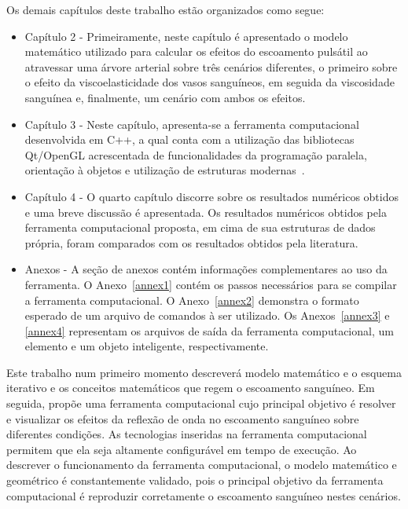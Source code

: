 Os demais capítulos deste trabalho estão organizados como segue:
\begin{itemize}
	\item Capítulo 2 -
	Primeiramente, neste capítulo é apresentado o modelo matemático utilizado para calcular os efeitos do escoamento pulsátil ao atravessar uma árvore arterial sobre três cenários diferentes, o primeiro sobre o efeito da viscoelasticidade dos vasos sanguíneos, em seguida da viscosidade sanguínea e, finalmente, um cenário com ambos os efeitos.
	
	\item Capítulo 3 -
	Neste capítulo, apresenta-se a ferramenta computacional desenvolvida em C++, a qual conta com a utilização das bibliotecas Qt/OpenGL acrescentada de funcionalidades da programação paralela, orientação à objetos e utilização de estruturas modernas~\cite{factorypattern}.
	
	\item Capítulo 4 -
	O quarto capítulo discorre sobre os resultados numéricos obtidos e uma breve discussão é apresentada. Os resultados numéricos obtidos pela ferramenta computacional proposta, em cima de sua estruturas de dados própria, foram comparados com os resultados obtidos pela literatura.
	
	\item Anexos -
	A seção de anexos contém informações complementares ao uso da ferramenta. O Anexo~\ref{annex1} contém os passos necessários para se compilar a ferramenta computacional. O Anexo~\ref{annex2} demonstra o formato esperado de um arquivo de comandos à ser utilizado. Os Anexos~\ref{annex3} e \ref{annex4} representam os arquivos de saída da ferramenta computacional, um elemento e um objeto inteligente, respectivamente.
\end{itemize}

Este trabalho num primeiro momento descreverá modelo matemático e o esquema iterativo e os conceitos matemáticos que regem o escoamento sanguíneo. Em seguida, propõe uma ferramenta computacional cujo principal objetivo é resolver e visualizar os efeitos da reflexão de onda no escoamento sanguíneo sobre diferentes condições. As tecnologias inseridas na ferramenta computacional permitem que ela seja altamente configurável em tempo de execução. Ao descrever o funcionamento da ferramenta computacional, o modelo matemático e geométrico é constantemente validado, pois o principal objetivo da ferramenta computacional é reproduzir corretamente o escoamento sanguíneo nestes cenários.

